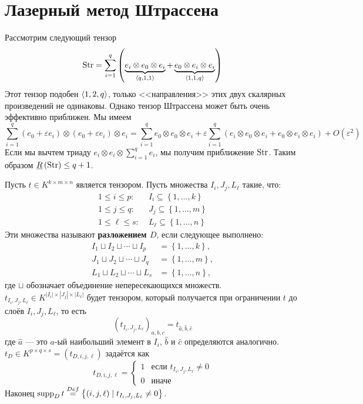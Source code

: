 \section{Лазерный метод Штрассена}

Рассмотрим следующий тензор
\[
	\operatorname{Str} = \sum_{i=1}^q \left(\underbrace{e_i \otimes e_0 \otimes e_i}_{\left\langle q,1,1 \right\rangle} + \underbrace{e_0 \otimes e_i \otimes e_i}_{\left\langle 1,1,q \right\rangle} \right)
\]
Этот тензор подобен $\left\langle 1,2,q \right\rangle$, только <<направления>> этих двух скалярных произведений не одинаковы. Однако тензор Штрассена может быть очень эффективно приближен. Мы имеем
\[
	\sum_{i=1}^q (e_0 + \varepsilon e_i) \otimes (e_0 + \varepsilon e_i) \otimes e_i 
	= \sum_{i=1}^q e_0 \otimes e_0 \otimes e_i + \varepsilon \sum_{i=1}^q \left( e_i \otimes e_0 \otimes e_i + e_0 \otimes e_i \otimes e_i \right) + O(\varepsilon^2)
\]
Если мы вычтем триаду $e_i \otimes e_i \otimes \sum_{i=1}^q e_i$, мы получим приближение $\operatorname{Str}$. Таким образом $\underline{R}\left(\operatorname{Str}\right) \leq q+1$.

\begin{definition}\label{def:bi:7.1}
	Пусть $t \in K^{k \times m \times n}$ является тензором. Пусть множества $I_i, J_j, L_{\ell}$ такие, что:
	\begin{align*}
		1 \leq i \leq p: & \; I_i \subseteq \left\{ 1, \dotsc, k \right\}   \\
		1 \leq j \leq q: & \; J_j \subseteq \left\{ 1, \dotsc, m \right\}   \\
		1 \leq \ell \leq s: & \; L_{\ell} \subseteq \left\{ 1, \dotsc, n \right\}   
	\end{align*}
	Эти множества называют \textbf{разложением $D$}, если следующее выполнено:
	\begin{align*}
		I_1 \sqcup I_2 \sqcup \dotsb \sqcup I_p & = \left\{ 1, \dotsc, k \right\}, \\
		J_1 \sqcup J_2 \sqcup \dotsb \sqcup J_q & = \left\{ 1, \dotsc, m \right\}, \\
		L_1 \sqcup L_2 \sqcup \dotsb \sqcup L_s & = \left\{ 1, \dotsc, n \right\},
	\end{align*}
	где $\sqcup$ обозначает объединение непересекающихся множеств. $t_{I_i, J_j, L_{\ell}} \in K^{|I_i| \times |J_j| \times |L_{\ell}|}$ будет тензором, который получается при ограничении $t$ до слоёв $I_i, J_j, L_{\ell}$, то есть
	\[
		(t_{I_i, J_j, L_{\ell}})_{a,b,c} = t_{\widehat{a}, \widehat{b}, \widehat{c}}
	\]
	где $\widehat{a}$ --- это $a$-ый наибольший элемент в $I_i$, $\widehat{b}$ и $\widehat{c}$ определяются аналогично. $t_D \in K^{p \times q \times s} = (t_{D,i,j,\ell})$ задаётся как
	\[
		t_{D,i,j,\ell} =
		\begin{cases}
			1 & \text{если } t_{I_i, J_j, L_{\ell}} \neq 0\\
			0 & \text{иначе }
		\end{cases}
	\]
	Наконец $\operatorname{supp}_D t \overset{Def}{=} \left\{ (i,j,\ell) \mid  t_{I_i, J_j, L_{\ell}} \neq 0\right\}$.
\end{definition}

